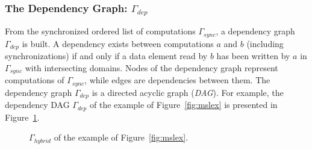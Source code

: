 \subsubsection*{The Dependency Graph: $\Gamma_{dep}$}
From the synchronized ordered list of computations $\Gamma_{sync}$, a dependency graph $\Gamma_{dep}$ is built.
A dependency exists between computations $a$ and $b$ (including synchronizations) if and only if a data element read by $b$ has been written by $a$ in $\Gamma_{sync}$ with intersecting domains.
Nodes of the dependency graph represent computations of $\Gamma_{sync}$, while edges are dependencies between them. The dependency graph $\Gamma_{dep}$ is a directed acyclic graph (\emph{DAG}). For example, the dependency DAG $\Gamma_{dep}$ of the example of Figure~\ref{fig:mslex} is presented in Figure~\ref{fig:hyb}.

\begin{figure}[t]
\begin{center}
\caption{$\Gamma_{hybrid}$ of the example of Figure~\ref{fig:mslex}.}
\label{fig:hyb}
\end{center}
\end{figure}

